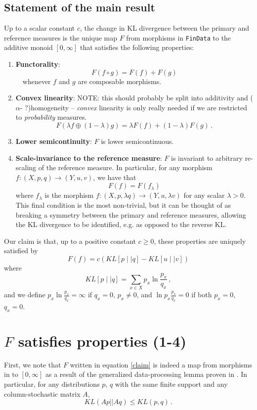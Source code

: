 \documentclass{article}
\begin{document}
\subsection{Statement of the main result}
Up to a scalar constant $c$, the change in KL divergence between the primary and reference measures is the unique map $F$ from morphisms in \texttt{FinData} to the additive monoid $[0, \infty]$ that satisfies the following properties:
\begin{enumerate}
    \item \textbf{Functorality}:
      $$
      F(f \circ g) = F(f) + F(g)
      $$
      $\quad$whenever $f$ and $g$ are composable morphisms.
      
    \item \textbf{Convex linearity}: NOTE: this should probably be split into additivity and ($\alpha$- ?)homogeneity  -- \textit{convex} linearity is only really needed if we are restricted to \textit{probability} measures.
      $$
        F(\lambda f \oplus (1-\lambda)g) = \lambda F(f) + (1 - \lambda)F(g)\,.
      $$
    \item \textbf{Lower semicontinuity}: $F$ is lower semicontinuous.
    \item \textbf{Scale-invariance to the reference measure}: $F$ is invariant to arbitrary re-scaling of the reference measure. In particular, for any morphism $f:(X, p, q) \rightarrow (Y, u, v)$, we have that 
      $$
        F(f) = F(f_\lambda)
      $$
    where $f_\lambda$ is the morphism $f:(X, p, \lambda q) \rightarrow (Y, u, \lambda v)$ for any scalar $\lambda > 0$. This final condition is the most non-trivial, but it can be thought of as breaking a symmetry between the primary and reference measures, allowing the KL divergence to be identified, e.g. as opposed to the reverse KL.
\end{enumerate}

Our claim is that, up to a positive constant $c \geq 0$, these properties are uniquely satisfied by 
\begin{equation} \label{claim}
    F(f) = c(KL[p \mid\mid q] - KL[u \mid\mid v])
\end{equation}
where
$$
 KL[p \mid\mid q] = \sum_{x\in X} p_x \ln \frac{p_x}{q_x}\,,
$$
and we define $p_x\ln \frac{p_x}{q_x} = \infty$ if $q_x = 0$, $p_x\neq 0$, and $\ln p_x\frac{p_x}{q_x} = 0$ if both $p_x = 0$, $q_x = 0$.

\section{$F$ satisfies properties (1-4)}
First, we note that $F$ written in equation \eqref{claim} is indeed a map from morphisms in  to $[0, \infty]$ as a result of the generalized data-processing lemma proven in \cite{cohenRelativeEntropyMappings1993}. In particular, for any distributions $p$, $q$ with the same finite support and any column-stochastic matrix $A$, 
$$
    KL(Ap || Aq) \leq KL(p, q)\,.
$$
\end{document}
